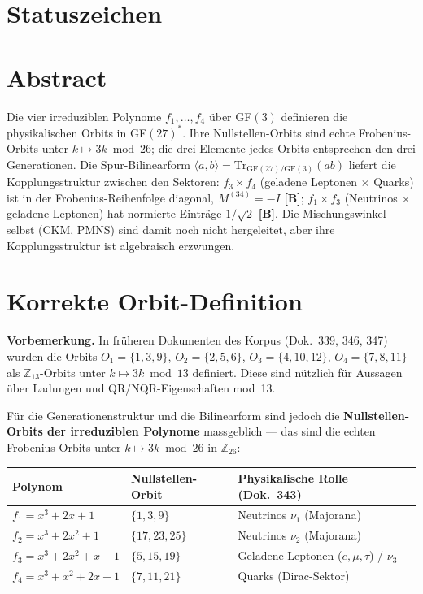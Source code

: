 
\providecommand{\BM}{\textbf{[B]}}
\providecommand{\KM}{\textbf{[K]}}
\providecommand{\SM}{\textbf{[S]}}

{}

\section*{Statuszeichen}


\section*{Abstract}

Die vier irreduziblen Polynome $f_1,\ldots,f_4$ über GF$(3)$ definieren die
physikalischen Orbits in GF$(27)^*$. Ihre Nullstellen-Orbits sind echte
Frobenius-Orbits unter $k\mapsto3k\bmod26$; die drei Elemente jedes Orbits
entsprechen den drei Generationen. Die Spur-Bilinearform
$\langle a,b\rangle = \mathrm{Tr}_{\mathrm{GF}(27)/\mathrm{GF}(3)}(ab)$
liefert die Kopplungsstruktur zwischen den Sektoren: $f_3\times f_4$
(geladene Leptonen $\times$ Quarks) ist in der Frobenius-Reihenfolge
diagonal, $M^{(34)}=-I$ \BM;
$f_1\times f_3$ (Neutrinos $\times$ geladene Leptonen) hat normierte
Einträge $1/\sqrt{2}$ \BM. Die Mischungswinkel selbst (CKM, PMNS) sind
damit noch nicht hergeleitet, aber ihre Kopplungsstruktur ist algebraisch
erzwungen.

\section{Korrekte Orbit-Definition}

\textbf{Vorbemerkung.} In früheren Dokumenten des Korpus (Dok.~339, 346, 347)
wurden die Orbits $O_1=\{1,3,9\}$, $O_2=\{2,5,6\}$, $O_3=\{4,10,12\}$,
$O_4=\{7,8,11\}$ als $\mathbb{Z}_{13}$-Orbits unter $k\mapsto3k\bmod13$
definiert. Diese sind nützlich für Aussagen über Ladungen und
QR/NQR-Eigenschaften mod~13.

Für die Generationenstruktur und die Bilinearform sind jedoch die
\textbf{Nullstellen-Orbits der irreduziblen Polynome} massgeblich ---
das sind die echten Frobenius-Orbits unter $k\mapsto3k\bmod26$ in $\mathbb{Z}_{26}$:

\begin{center}
\begin{tabular}{lll}
\toprule
Polynom & Nullstellen-Orbit & Physikalische Rolle (Dok.~343) \\
\midrule
$f_1 = x^3+2x+1$ & $\{1,3,9\}$ & Neutrinos $\nu_1$ (Majorana) \\
$f_2 = x^3+2x^2+1$ & $\{17,23,25\}$ & Neutrinos $\nu_2$ (Majorana) \\
$f_3 = x^3+2x^2+x+1$ & $\{5,15,19\}$ & Geladene Leptonen ($e,\mu,\tau$) / $\nu_3$ \\
$f_4 = x^3+x^2+2x+1$ & $\{7,11,21\}$ & Quarks (Dirac-Sektor) \\
\bottomrule
\end{tabular}
\end{center}

